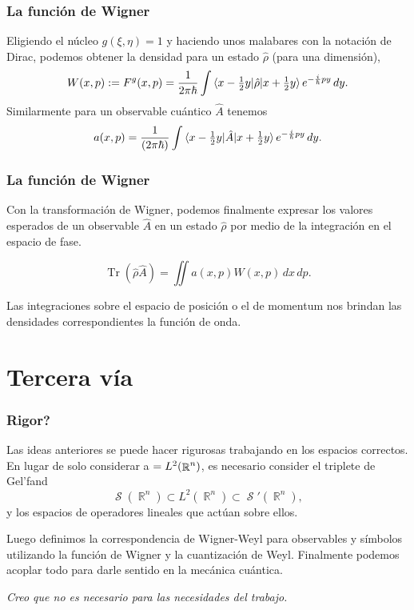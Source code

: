 \documentclass{beamer}
\DeclareMathOperator{\R}{\mathbb{R}}
\let\H\relax
\DeclareMathOperator{\H}{\mathcal H}
\DeclareMathOperator{\Sz}{\mathcal S}
\DeclareMathOperator{\Tr}{Tr}
\begin{document}
\begin{frame}
  \frametitle{La función de Wigner}

  Eligiendo el núcleo $g(\xi,\eta) = 1$ y haciendo unos
  malabares con la notación de Dirac, podemos obtener la
  densidad para un estado $\hat{\rho}$ (para una dimensión),
  \begin{equation}
    W(x,p)
    := F^{g}(x,p)
    = \frac{1}{2\pi\hbar} 
    \int \braket{x - \tfrac{1}{2}y|\hat{\rho}|x +
    \tfrac{1}{2}y} e^{-\frac{i}{\hbar} p y} \, dy.
  \end{equation}
  Similarmente para un observable cuántico $\hat{A}$ tenemos
  \begin{equation}
    a(x,p)
    = \frac{1}{(2\pi\hbar)} 
    \int \braket{x - \tfrac{1}{2}y|\hat{A}|x +
    \tfrac{1}{2}y} e^{-\frac{i}{\hbar} p y} \, dy.
  \end{equation}
\end{frame}

\begin{frame}
  \frametitle{La función de Wigner}

  Con la transformación de Wigner, podemos finalmente
  expresar los valores esperados de un observable $\hat{A}$
  en un estado $\hat{\rho}$ por medio de la integración en
  el espacio de fase.

  \begin{equation}
    \Tr\left( \hat{\rho}\hat{A} \right) 
    = \iint a(x,p) W(x,p) \, dx \, dp.
  \end{equation}

  Las integraciones sobre el espacio de posición o el de
  momentum nos brindan las densidades correspondientes la
  función de onda.
\end{frame}

\section{Tercera vía}

\begin{frame}
  \frametitle{Rigor?}

  Las ideas anteriores se puede hacer rigurosas trabajando
  en los espacios correctos. En lugar de solo considerar a
  $\H = L^2(\R^{n})$, es necesario consider el triplete de
  Gel'fand
  \begin{equation}
    \Sz(\R^{n}) \subset L^2(\R^{n}) \subset \Sz'(\R^{n}),
  \end{equation}
  y los espacios de operadores lineales que actúan sobre
  ellos.

  \hspace{2mm} Luego definimos la correspondencia de
  Wigner-Weyl para observables y símbolos utilizando la
  función de Wigner y la cuantización de Weyl. Finalmente
  podemos acoplar todo para darle sentido en la mecánica
  cuántica.

  \vspace{2mm}

  \textit{Creo que no es necesario para las necesidades del
  trabajo.}
\end{frame}
\end{document}
